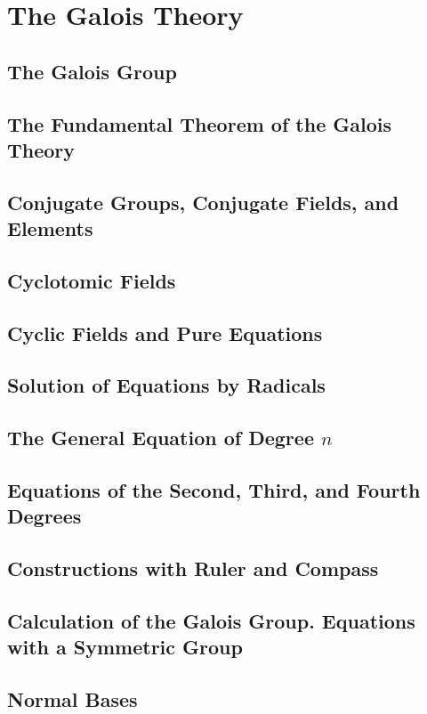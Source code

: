 \section{The Galois Theory}

\subsection{The Galois Group}

\subsection{The Fundamental Theorem of the Galois Theory}

\subsection{Conjugate Groups, Conjugate Fields, and Elements}

\subsection{Cyclotomic Fields}

\subsection{Cyclic Fields and Pure Equations}

\subsection{Solution of Equations by Radicals}

\subsection{The General Equation of Degree $n$}

\subsection{Equations of the Second, Third, and Fourth Degrees}

\subsection{Constructions with Ruler and Compass}

\subsection{Calculation of the Galois Group. Equations with a Symmetric Group}

\subsection{Normal Bases}